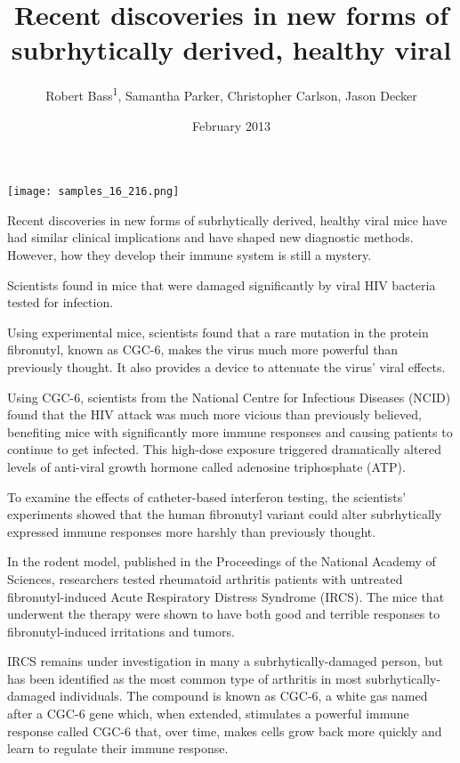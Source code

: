 \documentclass{article}
\title{Recent discoveries in new forms of subrhytically derived, healthy viral}
\author{Robert Bass\textsuperscript{1},  Samantha Parker,  Christopher Carlson,  Jason Decker}
\affil{\textsuperscript{1}McGill University}
\date{February 2013}
\begin{document}
\maketitle

\begin{center}
\begin{minipage}{0.75\linewidth}
\texttt{[image: samples\_16\_216.png]}
\end{minipage}
\end{center}

Recent discoveries in new forms of subrhytically derived, healthy viral mice have had similar clinical implications and have shaped new diagnostic methods. However, how they develop their immune system is still a mystery.

Scientists found in mice that were damaged significantly by viral HIV bacteria tested for infection.

Using experimental mice, scientists found that a rare mutation in the protein fibronutyl, known as CGC-6, makes the virus much more powerful than previously thought. It also provides a device to attenuate the virus’ viral effects.

Using CGC-6, scientists from the National Centre for Infectious Diseases (NCID) found that the HIV attack was much more vicious than previously believed, benefiting mice with significantly more immune responses and causing patients to continue to get infected. This high-dose exposure triggered dramatically altered levels of anti-viral growth hormone called adenosine triphosphate (ATP).

To examine the effects of catheter-based interferon testing, the scientists’ experiments showed that the human fibronutyl variant could alter subrhytically expressed immune responses more harshly than previously thought.

In the rodent model, published in the Proceedings of the National Academy of Sciences, researchers tested rheumatoid arthritis patients with untreated fibronutyl-induced Acute Respiratory Distress Syndrome (IRCS). The mice that underwent the therapy were shown to have both good and terrible responses to fibronutyl-induced irritations and tumors.

IRCS remains under investigation in many a subrhytically-damaged person, but has been identified as the most common type of arthritis in most subrhytically-damaged individuals. The compound is known as CGC-6, a white gas named after a CGC-6 gene which, when extended, stimulates a powerful immune response called CGC-6 that, over time, makes cells grow back more quickly and learn to regulate their immune response.
\end{document}
